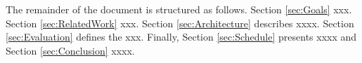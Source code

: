 \noindent\tab The remainder of the document is structured as follows. Section \ref{sec:Goals} xxx. Section \ref{sec:RelatedWork} xxx. Section \ref{sec:Architecture} describes xxxx. Section \ref{sec:Evaluation} defines the xxx. Finally, Section \ref{sec:Schedule} presents xxxx and Section \ref{sec:Conclusion} xxxx.
